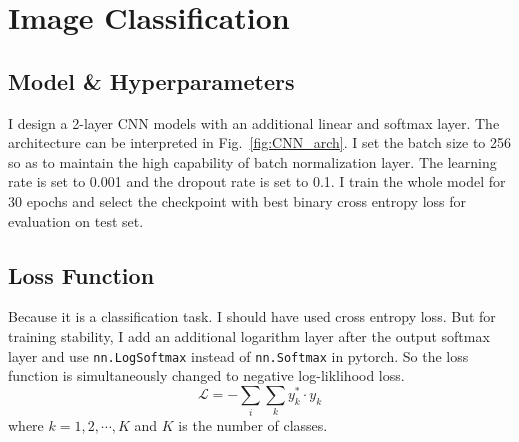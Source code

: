 \section{Image Classification}

\subsection{Model \& Hyperparameters}
I design a 2-layer CNN models with an additional linear and softmax layer. The architecture can be interpreted in Fig.~\ref{fig:CNN_arch}. 
I set the batch size to 256 so as to maintain the high capability of batch normalization layer. 
The learning rate is set to 0.001 and the dropout rate is set to 0.1.
I train the whole model for 30 epochs and select the checkpoint with best binary cross entropy loss for evaluation on test set.

\subsection{Loss Function}
Because it is a classification task. I should have used cross entropy loss. 
But for training stability, I add an additional logarithm layer after the output softmax layer and use \verb|nn.LogSoftmax| instead of \verb|nn.Softmax| in pytorch.
So the loss function is simultaneously changed to negative log-liklihood loss.
\begin{equation}
    \label{eq:nllloss}
    \mathcal{L}=-\sum_{i}\sum_{k}y_k^*\cdot y_k
\end{equation}
where $k=1,2,\cdots, K$ and $K$ is the number of classes.

